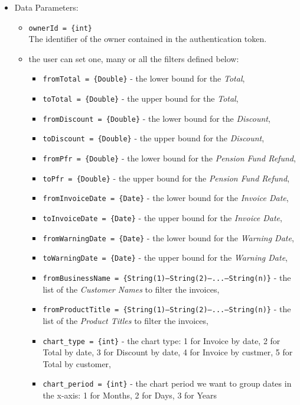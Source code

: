 \begin{itemize}
    \item Data Parameters: 
    \begin{itemize}
        \item \texttt{ownerId = \{int\}} \\
        The identifier of the owner contained in the authentication token.
        \item the user can set one, many or all the filters defined below: 
        \begin{itemize}
            \item \texttt{fromTotal = \{Double\}} - the lower bound for the \textit{Total},
            \item \texttt{toTotal = \{Double\}} - the upper bound for the \textit{Total},
            \item \texttt{fromDiscount = \{Double\}} - the lower bound for the \textit{Discount}, 
            \item \texttt{toDiscount = \{Double\}} - the upper bound for the \textit{Discount},
            \item \texttt{fromPfr = \{Double\}} - the lower bound for the \textit{Pension Fund Refund}, 
            \item \texttt{toPfr = \{Double\}} - the upper bound for the \textit{Pension Fund Refund},
            \item \texttt{fromInvoiceDate = \{Date\}} - the lower bound for the \textit{Invoice Date}, 
            \item \texttt{toInvoiceDate = \{Date\}} - the upper bound for the \textit{Invoice Date},
            \item \texttt{fromWarningDate = \{Date\}} - the lower bound for the \textit{Warning Date}, 
            \item \texttt{toWarningDate = \{Date\}} - the upper bound for the \textit{Warning Date},
            \item \texttt{fromBusinessName = \{String(1)---String(2)---...---String(n)\}} - the list of the \textit{Customer Names} to filter the invoices,
            \item \texttt{fromProductTitle = \{String(1)---String(2)---...---String(n)\}} - the list of the \textit{Product Titles} to filter the invoices,
            \item \texttt{chart\_type = \{int\}} - the chart type: 1 for Invoice by date, 2 for Total by date, 3 for Discount by date, 4 for Invoice by custmer, 5 for Total by customer,
            \item \texttt{chart\_period = \{int\}} - the chart period we want to group dates in the x-axis: 1 for Months, 2 for Days, 3 for Years
        \end{itemize}     
    \end{itemize}
    

\end{itemize}
